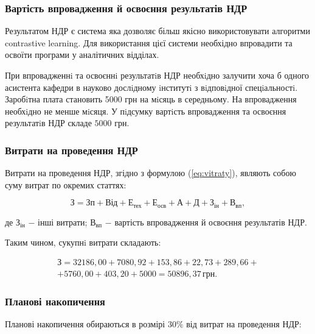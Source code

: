 \subsubsection{Вартість впровадження й освоєння результатів НДР}

Результатом НДР є система яка дозволяє більш якісно використовувати алгоритми contrastive learning. Для використання цієї системи необхідно впровадити та освоїти програми у аналітичних відділах.

При впровадженнi та освоєннi результатiв НДР необхiдно залучити хоча б одного асистента кафедри в науково дослiдному iнститутi з вiдповiдної спецiальностi. Заробiтна плата становить 5000 грн на мiсяць в середньому. На впровадження необхiдно не менше мiсяця. У пiдсумку вартiсть впровадження та освоєння результатiв НДР складе $5000$ грн.

\subsubsection{Витрати на проведення НДР}

Витрати на проведення НДР, згідно з формулою (\ref{eq:vitraty}), являють собою суму витрат по окремих статтях:

\begin{equation}\label{eq:vitraty}
\text{З} = \text{Зп} + \text{Від} + \text{Е}_{\text{тех}} + \text{Е}_{\text{осв}} + \text{А} + \text{Д} + \text{З}_{\text{ін}} + \text{В}_{\text{вп}},
\end{equation}

\noindent де $\text{З}_{\text{ін}}$ $-$ інші витрати; \newline
\hspace*{15pt} $ \text{В}_{\text{вп}}$ $-$ вартість впровадження й освоєння результатів НДР.

Таким чином, сукупнi витрати складають:

\begin{eqnarray*}
\text{З} = 32186,00 + 7080,92 + 153,86 + 22,73 + 289,66 + \\ + 5760,00 + 403,20 + 5000  = 50896,37 \, \text{грн}.
\end{eqnarray*}

\vspace{1.5em}

\subsubsection{Планові накопичення}

Планові накопичення обираються в розмірі $30\%$ від витрат на проведення НДР: 

